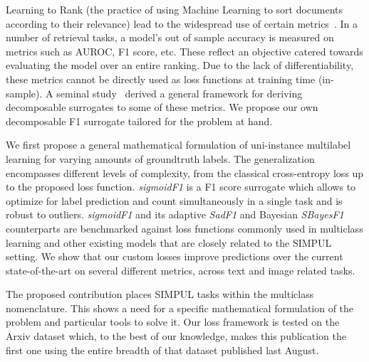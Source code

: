 Learning to Rank (the practice of using Machine Learning to sort documents according to their relevance) lead to the widespread use of certain metrics~\cite{LTR}. In a number of retrieval tasks, a model's out of sample accuracy is measured on metrics such as AUROC, F1 score, etc. These reflect an objective catered towards evaluating the model over an entire ranking. Due to the lack of differentiability, these metrics cannot be directly used as loss functions at training time (in-sample). A seminal study~\cite{optimizableLosses} derived a general framework for deriving decomposable surrogates to some of these metrics. We propose our own decomposable F1 surrogate tailored for the problem at hand.

We first propose a general mathematical formulation of uni-instance multilabel learning for varying amounts of groundtruth labels. The generalization encompasses different levels of complexity, from the classical cross-entropy loss up to the proposed loss function. \emph{sigmoidF1} is a F1 score surrogate which allows to optimize for label prediction and count simultaneously in a single task and is robust to outliers.  \emph{sigmoidF1} and its adaptive \emph{SadF1} and Bayesian \emph{SBayesF1} counterparts are benchmarked against loss functions commonly used in multiclass learning and other existing models that are closely related to the SIMPUL setting. We show that our custom losses improve predictions over the current  state-of-the-art on several different metrics, across text and image related tasks.

The proposed contribution places SIMPUL tasks within the multiclass nomenclature. This shows a need for a specific mathematical formulation of the problem and particular tools to solve it. Our loss framework is tested on the Arxiv dataset which, to the best of our knowledge, makes this publication the first one using the entire breadth of that dataset published last August.





